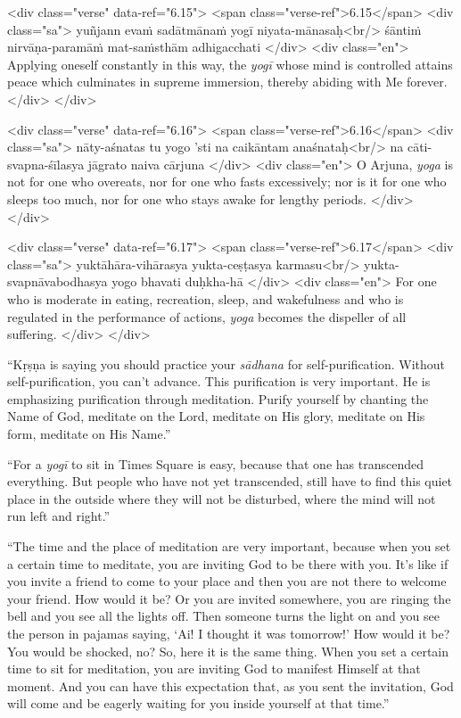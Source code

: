 \begin{html}
<div class="verse" data-ref="6.15">
  <span class="verse-ref">6.15</span>
  <div class="sa">
    yuñjann evaṁ sadātmānaṁ yogī niyata-mānasaḥ<br/>
    śāntiṁ nirvāṇa-paramāṁ mat-saṁsthām adhigacchati
  </div>
  <div class="en">
    Applying oneself constantly in this way, the \textit{yogī} whose mind is controlled attains peace which culminates in supreme immersion, thereby abiding with Me forever.
  </div>
</div>
\end{html}



\begin{html}
<div class="verse" data-ref="6.16">
  <span class="verse-ref">6.16</span>
  <div class="sa">
    nāty-aśnatas tu yogo ’sti na caikāntam anaśnataḥ<br/>
    na cāti-svapna-śīlasya jāgrato naiva cārjuna
  </div>
  <div class="en">
    O Arjuna, \textit{yoga} is not for one who overeats, nor for one who fasts excessively; nor is it for one who sleeps too much, nor for one who stays awake for lengthy periods.
  </div>
</div>
\end{html}



\begin{html}
<div class="verse" data-ref="6.17">
  <span class="verse-ref">6.17</span>
  <div class="sa">
    yuktāhāra-vihārasya yukta-ceṣṭasya karmasu<br/>
    yukta-svapnāvabodhasya yogo bhavati duḥkha-hā
  </div>
  <div class="en">
    For one who is moderate in eating, recreation, sleep, and wakefulness and who is regulated in the performance of actions, \textit{yoga} becomes the dispeller of all suffering.
  </div>
</div>
\end{html}



\enquote{Kṛṣṇa is saying you should practice your \textit{sādhana} for self-purification. Without self-purification, you can’t advance. This purification is very important. He is emphasizing purification through meditation. Purify yourself by chanting the Name of God, meditate on the Lord, meditate on His glory, meditate on His form, meditate on His Name.}

\enquote{For a \textit{yogī} to sit in Times Square is easy, because that one has transcended everything. But people who have not yet transcended, still have to find this quiet place in the outside where they will not be disturbed, where the mind will not run left and right.}

\enquote{The time and the place of meditation are very important, because when you set a certain time to meditate, you are inviting God to be there with you. It’s like if you invite a friend to come to your place and then you are not there to welcome your friend. How would it be? Or you are invited somewhere, you are ringing the bell and you see all the lights off. Then someone turns the light on and you see the person in pajamas saying, \enquote{Ai! I thought it was tomorrow!} How would it be? You would be shocked, no? So, here it is the same thing. When you set a certain time to sit for meditation, you are inviting God to manifest Himself at that moment. And you can have this expectation that, as you sent the invitation, God will come and be eagerly waiting for you inside yourself at that time.}

